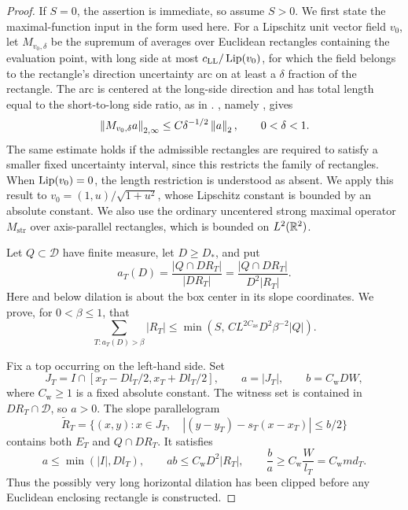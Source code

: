 \begin{proof}
If \(S=0\), the assertion is immediate, so assume \(S>0\).
We first state the maximal-function input in the form used here.
For a Lipschitz unit vector field \(v_0\), let
\(M_{v_0,\delta}\) be the supremum of averages over Euclidean
rectangles containing the evaluation point, with long side at most
\(c_{\mathrm{LL}}/\operatorname{Lip}(v_0)\), for which the field belongs to
the rectangle's direction uncertainty arc on at least a
\(\delta\) fraction of the rectangle. The arc is centered at the
long-side direction and has total length equal to the short-to-long
side ratio, as in . , namely \cite[Theorem~1.4]{LLKakeya}, gives
\begin{equation}\label{forest:eq-kakeya-input}
 \left\|M_{v_0,\delta}a\right\|_{2,\infty}
       \le C\delta^{-1/2}\left\|a\right\|_2,
       \qquad 0<\delta<1.
\end{equation}
The same estimate holds if the admissible rectangles are required to
satisfy a smaller fixed uncertainty interval, since this restricts the
family of rectangles. When \(\operatorname{Lip}(v_0)=0\), the length restriction
is understood as absent. We apply this result to
\(v_0=(1,u)/\sqrt{1+u^2}\), whose Lipschitz constant is bounded
by an absolute constant. We also use the ordinary uncentered strong
maximal operator \(M_{\mathrm{str}}\) over axis-parallel rectangles,
which is bounded on \(L^2(\mathbb R^2)\).

Let \(Q\subset\mathcal D\) have finite measure, let
\(D\ge D_*\), and put
\[
 a_T(D)=\frac{|Q\cap DR_T|}{|DR_T|}
       =\frac{|Q\cap DR_T|}{D^2|R_T|}.
\]
Here and below dilation is about the box center in its slope
coordinates. We prove, for \(0<\beta\le1\), that
\begin{equation}\label{forest:eq-dilation-tail}
 \sum_{T:a_T(D)>\beta}|R_T|
 \le \min\left(S,\,
       C L^{2C_{\mathrm{as}}}D^2\beta^{-2}|Q|\right).
\end{equation}

Fix a top occurring on the left-hand side. Set
\[
 J_T=I\cap[x_T-Dl_T/2,x_T+Dl_T/2],\qquad a=|J_T|,
 \qquad b=C_{\mathrm{w}}DW,
\]
where \(C_{\mathrm{w}}\ge1\) is a fixed absolute constant.
The witness set is contained in \(DR_T\cap\mathcal D\), so
\(a>0\). The slope parallelogram
\[
 \widetilde R_T=\{(x,y):x\in J_T,\quad
       |(y-y_T)-s_T(x-x_T)|\le b/2\}
\]
contains both \(E_T\) and \(Q\cap DR_T\). It satisfies
\begin{equation}\label{forest:eq-clipped-geometry}
 a\le\min(|I|,Dl_T),\qquad
 ab\le C_{\mathrm{w}}D^2|R_T|,\qquad
 \frac ba\ge C_{\mathrm{w}}\frac W{l_T}
             =C_{\mathrm{w}}m d_T.
\end{equation}
Thus the possibly very long horizontal dilation has been clipped
before any Euclidean enclosing rectangle is constructed.


\end{proof}
